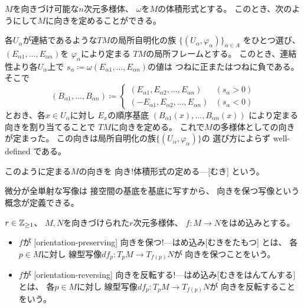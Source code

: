 \documentclass[report]{jlreq}
\begin{document}
\begin{definition}[体積形式が定める向き]
    $M$を向きづけ可能な$n$次元多様体、
    $\omega$を$M$の体積形式とする。
    このとき、次のようにして$M$に向きを定めることができる。

    各$U_\alpha$が連結であるような$TM$の局所自明化の族
    $\{ (U_\alpha, \varphi_\alpha) \}_{\alpha \in A}$
    をひとつ選び、
    $(E_{\alpha 1}, \dots, E_{\alpha n})$を
    $\varphi_\alpha$により定まる
    $TM$の局所フレームとする。
    このとき、連結性より各$U_\alpha$上で
    $s_\alpha \coloneqq \omega(E_{\alpha 1}, \dots, E_{\alpha n})$の値は
    つねに正またはつねに負である。
    そこで
    \begin{equation}
        (B_{\alpha 1}, \dots, B_{\alpha n})
            \coloneqq \begin{cases}
                (E_{\alpha 1}, E_{\alpha 2}, \dots, E_{\alpha n}) & (s_\alpha > 0) \\
                (-E_{\alpha 1}, E_{\alpha 2}, \dots, E_{\alpha n}) & (s_\alpha < 0)
            \end{cases}
    \end{equation}
    とおき、各$x \in U_\alpha$に対し
    $E_x$の順序基底
    $(B_{\alpha 1}(x), \dots, B_{\alpha n}(x))$
    により定まる向きを割り当てることで
    $TM$に向きを定める。
    これで$M$の多様体としての向きが定まった。
    この向きは局所自明化の族$\{ (U_\alpha, \varphi_\alpha) \}$の
    選び方によらず well-defined である。

    このように定まる$M$の向きを
        {向き!体積形式の定める---}[むき]
    という。
\end{definition}

微分が全単射な{\smooth}写像は
接空間の基底を基底に写すから、
向きを保つ{\smooth}写像という概念が定義できる。

\begin{definition}[向きを保つはめ込み]
    $r \in \mathbb{Z}_{\ge 1}$、
    $M, N$を向きづけられた$r$次元多様体、
    $f \colon M \to N$をはめ込みとする。
    \begin{itemize}
        \item $f$が
            [orientation-preserving]
                {向きを保つ!---はめ込み}[むきをたもつ]
            とは、
            各$p \in M$に対し
            線型写像$df_p \colon T_pM \to T_{f(p)}N$が
            向きを保つことをいう。
        \item $f$が
            [orientation-reversing]
                {向きを反転する!---はめ込み}[むきをはんてんする]
            とは、
            各$p \in M$に対し
            線型写像$df_p \colon T_pM \to T_{f(p)}N$が
            向きを反転することをいう。
    \end{itemize}
\end{definition}
\end{document}
